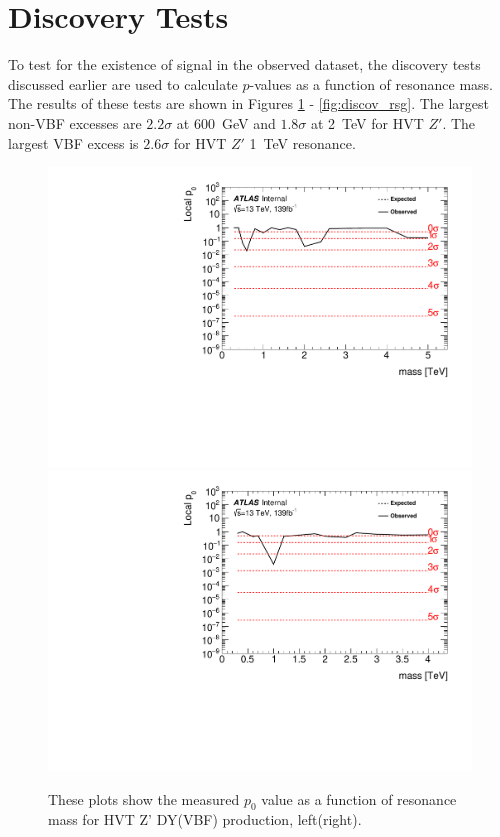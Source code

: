 \section{Discovery Tests}
\label{discovery}
To test for the existence of signal in the observed dataset, the discovery tests discussed earlier are used to calculate $p$-values as a function of resonance mass. The results of these tests are shown in Figures \ref{fig:discov_hvtww} - \ref{fig:discov_rsg}. The largest non-VBF excesses are $2.2\sigma$ at 600~GeV and $1.8\sigma$ at 2~TeV for HVT $Z'$. The largest VBF excess is $2.6\sigma$ for HVT $Z'$ 1~TeV resonance. 
 \begin{figure}[h!]
  \centering
  \includegraphics[width=0.48\hsize]{figures/results/pvalues/fixed_pvalues/hvtww_pvalue.pdf}
    \includegraphics[width=0.48\hsize]{figures/results/pvalues/fixed_pvalues/hvtwwvbf_pvalue.pdf}
 \caption{These plots show the measured $p_{0}$ value as a function of resonance mass for HVT Z' DY(VBF) production, left(right).} 
  \label{fig:discov_hvtww}
\end{figure} 
\FloatBarrier


